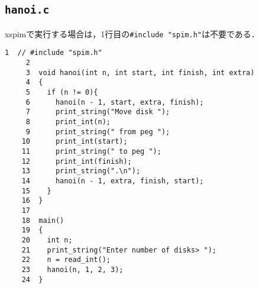 \subsection{\texttt{hanoi.c}} \label{sec:hanoi.c}
xspimで実行する場合は，1行目の\verb|#include "spim.h"|は不要である．
\begin{Verbatim}[fontsize=\small, baselinestretch=0.8]
     1  // #include "spim.h"
     2
     3  void hanoi(int n, int start, int finish, int extra)
     4  {
     5    if (n != 0){
     6      hanoi(n - 1, start, extra, finish);
     7      print_string("Move disk ");
     8      print_int(n);
     9      print_string(" from peg ");
    10      print_int(start);
    11      print_string(" to peg ");
    12      print_int(finish);
    13      print_string(".\n");
    14      hanoi(n - 1, extra, finish, start);
    15    }
    16  }
    17
    18  main()
    19  {
    20    int n;
    21    print_string("Enter number of disks> ");
    22    n = read_int();
    23    hanoi(n, 1, 2, 3);
    24  }
\end{Verbatim}

